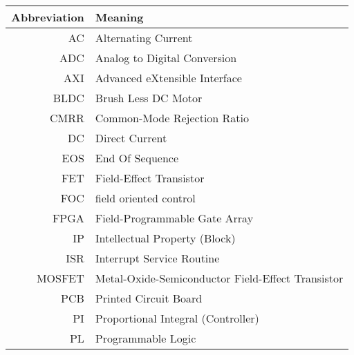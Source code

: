 \begin{table}[H]
\centering
\begin{tabular}{|r|l|}
\hline
\textbf{Abbreviation} & \textbf{Meaning}                                        \\ \hline
AC           & Alternating Current                                              \\ \hline
ADC          & Analog to Digital Conversion                                     \\ \hline
AXI          & Advanced eXtensible Interface                                    \\ \hline
BLDC         & Brush Less DC Motor                                              \\ \hline
CMRR         & Common-Mode Rejection Ratio                                      \\ \hline
DC           & Direct Current                                                   \\ \hline
EOS          & End Of Sequence                                                  \\ \hline
FET          & Field-Effect Transistor                                          \\ \hline
FOC          & field oriented control
            \\ \hline
FPGA         & Field-Programmable Gate Array                                    \\ \hline
IP           & Intellectual Property (Block)                                    \\ \hline
ISR          & Interrupt Service Routine                                        \\ \hline
MOSFET       & Metal-Oxide-Semiconductor Field-Effect Transistor                \\ \hline
PCB          & Printed Circuit Board                                            \\ \hline
PI           & Proportional Integral (Controller)                               \\ \hline
PL           & Programmable Logic                                               \\ \hline

\end{tabular}
\end{table}
